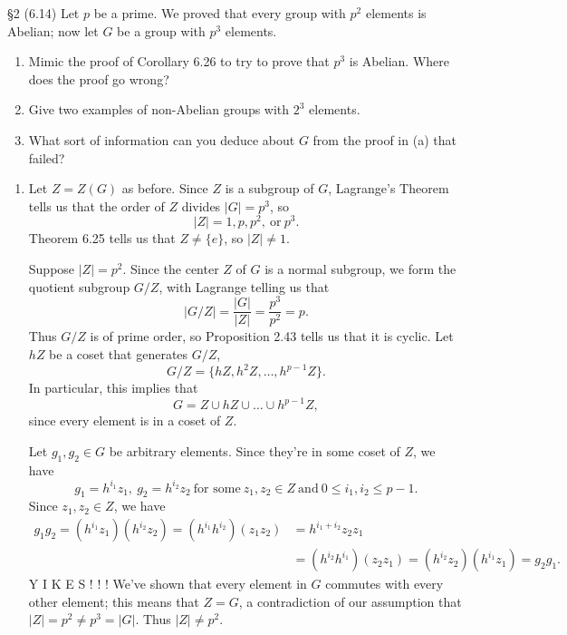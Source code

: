 \documentclass{homework}
\begin{document}
\begin{problem}{\S 2}
  (6.14) Let $p$ be a prime. We proved that every group with $p^2$ elements is Abelian; now let $G$
  be a group with $p^3$ elements.
  \begin{enumerate}[label=(\alph*)]
    \item Mimic the proof of Corollary 6.26 to try to prove that $p^3$ is Abelian. Where does the
      proof go wrong?
    \item Give two examples of non-Abelian groups with $2^3$ elements. 
    \item What sort of information can you deduce about $G$ from the proof in (a) that failed?
  \end{enumerate}
\end{problem}

\begin{solution}
  \begin{enumerate}[label=(\alph*)]
    \item Let $Z=Z(G)$ as before. Since $Z$ is a subgroup of $G$, Lagrange's Theorem tells us that
      the order of $Z$ divides $\left| G \right| =p^3$, so \[
        \left| Z \right| =1,p,p^2,~\text{or}~p^3
      .\] Theorem 6.25 tells us that $Z\neq \{ e \}$, so $\left| Z \right| \neq 1$. 

      Suppose $\left| Z \right| =p^2$. Since the center $Z$ of $G$ is a normal subgroup, we form the
      quotient subgroup $G / Z$, with Lagrange telling us that \[
        \left| G/Z \right| =\frac{\left| G \right| }{\left| Z \right| }=\frac{p^3}{p^2}=p
      .\] Thus $G / Z$ is of prime order, so Proposition 2.43 tells us that it is cyclic. Let $hZ$
      be a coset that generates $G / Z$, \[
        G / Z = \{ hZ,h^2Z,\ldots,h^{p-1}Z \}
      .\] In particular, this implies that \[
        G = Z\cup hZ\cup \ldots\cup h^{p-1}Z
      ,\] since every element is in a coset of $Z$.

      Let $g_1,g_2\in G$ be arbitrary elements. Since they're in some coset of $Z$, we have \[
        g_1=h^{i_1}z_1,\ g_2=h^{i_2}z_2~\text{for some}~z_1,z_2\in Z~\text{and}~0\le i_1,i_2\le p-1
      .\] Since $z_1,z_2\in Z$, we have
      \begin{align*}
          g_1g_2=(h^{i_1}z_1)(h^{i_2}z_2)=(h^{i_1}h^{i_2})(z_1z_2)&= h^{i_1+i_2}z_2z_1 \\
    &= (h^{i_2}h^{i_1})(z_2z_1)=(h^{i_2}z_2)(h^{i_1}z_1)=g_2g_1
      .\end{align*}
      Y I K E S ! ! ! We've shown that every element in $G$ commutes with every other element; this
      means that $Z=G$, a contradiction of our assumption that $\left| Z \right| =p^2\neq p^3=\left|
      G\right| $. Thus $\left| Z \right| \neq p^2$.


\end{enumerate}
\end{solution}
\end{document}
